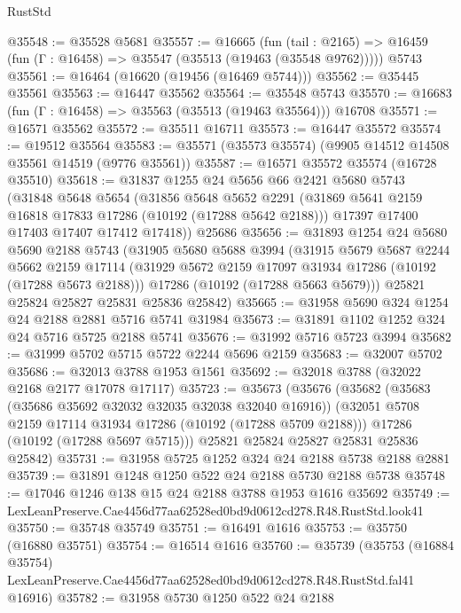\begin{lexlean}{RustStd}
\begin{coremodule}
@35548 := @35528 @5681
@35557 := @16665
    (fun (tail : @2165) => @16459 (fun (Γ : @16458) => @35547 (@35513 (@19463 (@35548 @9762)))))
    @5743
@35561 := @16464 (@16620 (@19456 (@16469 @5744)))
@35562 := @35445 @35561
@35563 := @16447 @35562
@35564 := @35548 @5743
@35570 := @16683 (fun (Γ : @16458) => @35563 (@35513 (@19463 @35564))) @16708
@35571 := @16571 @35562
@35572 := @35511 @16711
@35573 := @16447 @35572
@35574 := @19512 @35564
@35583 := @35571 (@35573 @35574) (@9905 @14512 @14508 @35561 @14519 (@9776 @35561))
@35587 := @16571 @35572 @35574 (@16728 @35510)
@35618 := @31837
    @1255
    @24
    @5656
    @66
    @2421
    @5680
    @5743
    (@31848
      @5648
      @5654
      (@31856
        @5648
        @5652
        @2291
        (@31869 @5641 @2159 @16818 @17833 @17286 (@10192 (@17288 @5642 @2188)))
        @17397
        @17400
        @17403
        @17407
        @17412
        @17418))
    @25686
@35656 := @31893
    @1254
    @24
    @5680
    @5690
    @2188
    @5743
    (@31905
      @5680
      @5688
      @3994
      (@31915
        @5679
        @5687
        @2244
        @5662
        @2159
        @17114
        (@31929 @5672 @2159 @17097 @31934 @17286 (@10192 (@17288 @5673 @2188)))
        @17286
        (@10192 (@17288 @5663 @5679)))
      @25821
      @25824
      @25827
      @25831
      @25836
      @25842)
@35665 := @31958 @5690 @324 @1254 @24 @2188 @2881 @5716 @5741 @31984
@35673 := @31891 @1102 @1252 @324 @24 @5716 @5725 @2188 @5741
@35676 := @31992 @5716 @5723 @3994
@35682 := @31999 @5702 @5715 @5722 @2244 @5696 @2159
@35683 := @32007 @5702
@35686 := @32013 @3788 @1953 @1561
@35692 := @32018 @3788 (@32022 @2168 @2177 @17078 @17117)
@35723 := @35673
    (@35676
      (@35682
        (@35683 (@35686 @35692 @32032 @32035 @32038 @32040 @16916))
        (@32051 @5708 @2159 @17114 @31934 @17286 (@10192 (@17288 @5709 @2188)))
        @17286
        (@10192 (@17288 @5697 @5715)))
      @25821
      @25824
      @25827
      @25831
      @25836
      @25842)
@35731 := @31958 @5725 @1252 @324 @24 @2188 @5738 @2188 @2881
@35739 := @31891 @1248 @1250 @522 @24 @2188 @5730 @2188 @5738
@35748 := @17046 @1246 @138 @15 @24 @2188 @3788 @1953 @1616 @35692
@35749 := LexLeanPreserve.Cae4456d77aa62528ed0bd9d0612cd278.R48.RustStd.look41
@35750 := @35748 @35749
@35751 := @16491 @1616
@35753 := @35750 (@16880 @35751)
@35754 := @16514 @1616
@35760 := @35739
    (@35753
      (@16884 @35754)
      LexLeanPreserve.Cae4456d77aa62528ed0bd9d0612cd278.R48.RustStd.fal41
      @16916)
@35782 := @31958
    @5730
    @1250
    @522
    @24
    @2188

\end{coremodule}
\end{lexlean}

